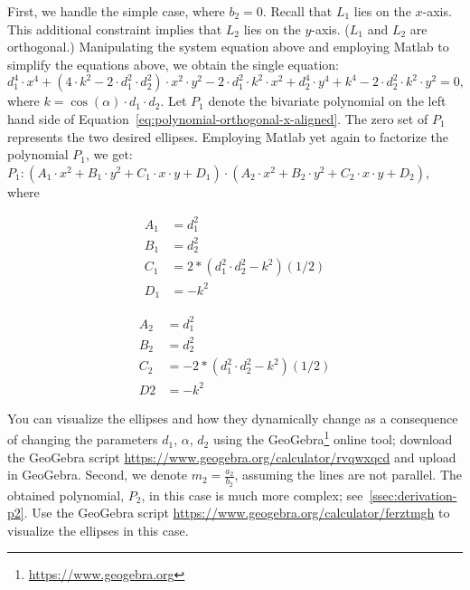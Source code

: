 First, we handle the simple case, where $b_2 = 0$. Recall that $L_1$ lies on the $x$-axis. This additional constraint implies that $L_2$ lies on the $y$-axis. ($L_1$ and $L_2$ are orthogonal.) Manipulating the system equation above and employing Matlab to simplify the equations above, we obtain the single equation:
\begin{equation}
  d_1^4\cdot x^4 + (4\cdot k^2 - 2\cdot d_1^2\cdot d_2^2)\cdot x^2\cdot y^2 - 2\cdot d_1^2\cdot k^2\cdot x^2 + d_2^4\cdot y^4 + k^4 - 2\cdot d_2^2\cdot k^2\cdot y^2 = 0\label{eq:polynomial-orthogonal-x-aligned},
\end{equation}
where $k = \cos(\alpha)\cdot d_1\cdot d_2$. Let $P_1$ denote the bivariate polynomial on the left hand side of Equation~\ref{eq:polynomial-orthogonal-x-aligned}. The zero set of $P_1$ represents the two desired ellipses. Employing Matlab yet again to factorize the polynomial $P_1$, we get: $P_1: (A_1\cdot x^2 + B_1\cdot y^2 + C_1\cdot x\cdot y + D_1)\cdot (A_2\cdot x^2 + B_2\cdot y^2 + C_2\cdot x\cdot y +D_2)$, where
\begin{minipage}[c]{0.5\linewidth}
\begin{align*}
  A_1 &= d_1^2\\
  B_1 &= d_2^2\\
  C_1 &= 2*(d_1^2\cdot d_2^2 - k^2)(1/2)\\
  D_1 &= -k^2
\end{align*}
\end{minipage}
\begin{minipage}[c]{0.5\linewidth}
\begin{align*}
  A_2 &= d_1^2\\
  B_2 &= d_2^2\\
  C_2 &= -2*(d_1^2\cdot d_2^2 - k^2)(1/2)\\
  D2 &= -k^2
\end{align*}
\end{minipage}
You can visualize the ellipses and how they dynamically change as a
consequence of changing the parameters $d_1$, $\alpha$, $d_2$ using
the GeoGebra\footnote{\url{https://www.geogebra.org}} online tool;
download the GeoGebra script
\url{https://www.geogebra.org/calculator/rvqwxqcd} and upload in
GeoGebra. Second, we denote $m_2 = \frac{a_2}{b_2}$, assuming the
lines are not parallel. The obtained polynomial, $P_2$, in this case
is much more complex; see~\ref{ssec:derivation-p2}. Use the GeoGebra
script \url{https://www.geogebra.org/calculator/ferztmgh} to visualize
the ellipses in this case.
